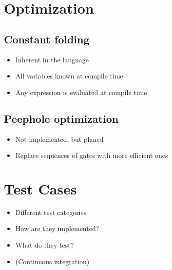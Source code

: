 \section{Optimization}
\subsection{Constant folding}
\begin{itemize}
    \item Inherent in the language
    \item All variables known at compile time
    \item Any expression is evaluated at compile time
\end{itemize}
\subsection{Peephole optimization}
\begin{itemize}
    \item Not implemented, but planed
    \item Replace sequences of gates with more efficient ones
\end{itemize}

\section{Test Cases}
\begin{itemize}
    \item Different test categories
    \item How are they implemented?
    \item What do they test?
    \item (Continuous integration) 
\end{itemize}